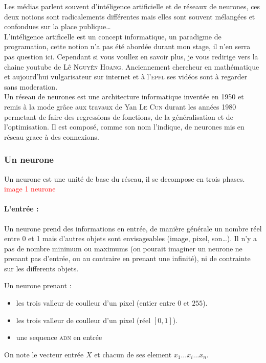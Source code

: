 
Les médias parlent souvent d'intéligence artificielle et de réseaux de neurones,
ces deux notions sont radicalements différentes
mais elles sont souvent mélangées et confondues sur la place publique\ldots \\

L'intéligence artificelle est un concept informatique, un paradigme de programation,
cette notion n'a pas été abordée durant mon stage, il n'en serra pas question ici.
Cependant si vous voullez en savoir plus, je vous redirige vers la chaine youtube de Lê \textsc{Nguyên Hoang}.
Anciennement chercheur en mathématique et aujourd'hui vulgarisateur sur internet et à l'\textsc{epfl}
ses vidéos sont à regarder sans moderation\cite{science4all}. \\

Un réseau de neurones est une architecture informatique inventée en 1950 et remis à la mode grâce aux travaux
de Yan \textsc{Le Cun} durant les années 1980 permetant de faire des regressions de fonctions,
de la généralisation et de l'optimisation.
Il est composé, comme son nom l'indique, de neurones mis en réseau grace à des connexions.


\subsubsection{Un neurone}
Un neurone est une unité de base du réseau, il se decompose en trois phases.
\textcolor{red}{image 1 neurone}


\paragraph{L'entrée :}
Un neurone prend des informations en entrée, de manière générale un nombre réel entre 0 et 1
mais d'autres objets sont envisageables (image, pixel, son\ldots).
Il n'y a pas de nombre minimum ou maximums
(on pourait imaginer un neurone ne prenant pas d'entrée, ou au contraire en prenant une infinité),
ni de contrainte sur les differents objets.
\exemle
{
Un neurone prenant :
\begin{itemize}
    \item les trois valleur de coulleur d'un pixel (entier entre $0$ et $255$).
    \item les trois valleur de coulleur d'un pixel (réel $[0, 1]$).
    \item une sequence \textsc{adn} en entrée

\end{itemize}
}
On note le vecteur entrée $X$ et chacun de ses element $x_1 \ldots x_i \ldots x_n$.

